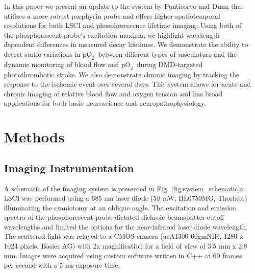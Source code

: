 \documentclass[12pt]{spieman}  %
\newcommand{\pO}{\ensuremath{\text{pO}_2}} 	            %
\begin{document}
\begin{spacing}{2}
In this paper we present an update to the system by Ponticorvo and Dunn \cite{Ponticorvo:2010uv} that utilizes a more robust porphyrin probe \cite{Esipova:2011hi} and offers higher spatiotemporal resolutions for both LSCI and phosphorescence lifetime imaging. Using both of the phosphorescent probe's excitation maxima, we highlight wavelength-dependent differences in measured decay lifetimes. We demonstrate the ability to detect static variations in \pO\ between different types of vasculature and the dynamic monitoring of blood flow and \pO\ during DMD-targeted photothrombotic stroke. We also demonstrate chronic imaging by tracking the response to the ischemic event over several days. This system allows for acute and chronic imaging of relative blood flow and oxygen tension and has broad applications for both basic neuroscience and neuropathophysiology.


\section{Methods}
\label{sect:methods}

\subsection{Imaging Instrumentation}
A schematic of the imaging system is presented in Fig.~\ref{fig:system_schematic}a. LSCI was performed using a 685 nm laser diode (50 mW, HL6750MG, Thorlabs) illuminating the craniotomy at an oblique angle. The excitation and emission spectra of the phosphorescent probe dictated dichroic beamsplitter cutoff wavelengths and limited the options for the near-infrared laser diode wavelength. The scattered light was relayed to a CMOS camera (acA1300-60gmNIR, 1280 x 1024 pixels, Basler AG) with 2x magnification for a field of view of 3.5 mm x 2.8 mm. Images were acquired using custom software written in C++ at 60 frames per second with a 5 ms exposure time.


\end{spacing}
\end{document}
